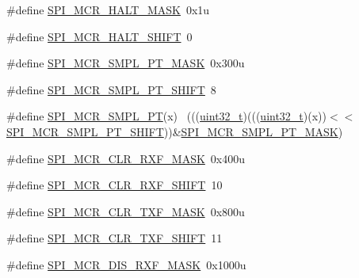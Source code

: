 \begin{DoxyCompactItemize}
\item 
\#define \hyperlink{group___s_p_i___register___masks_ga88c670302548b2d5b5f032b5709bc366}{S\+P\+I\+\_\+\+M\+C\+R\+\_\+\+H\+A\+L\+T\+\_\+\+M\+A\+SK}~0x1u
\item 
\#define \hyperlink{group___s_p_i___register___masks_ga8f13f49cf8502462271d8a179338d81b}{S\+P\+I\+\_\+\+M\+C\+R\+\_\+\+H\+A\+L\+T\+\_\+\+S\+H\+I\+FT}~0
\item 
\#define \hyperlink{group___s_p_i___register___masks_gaebb0539e04af465a39892f5aaabc872d}{S\+P\+I\+\_\+\+M\+C\+R\+\_\+\+S\+M\+P\+L\+\_\+\+P\+T\+\_\+\+M\+A\+SK}~0x300u
\item 
\#define \hyperlink{group___s_p_i___register___masks_ga1ffc13b9075cc6b0b34ea3162d6c1b74}{S\+P\+I\+\_\+\+M\+C\+R\+\_\+\+S\+M\+P\+L\+\_\+\+P\+T\+\_\+\+S\+H\+I\+FT}~8
\item 
\#define \hyperlink{group___s_p_i___register___masks_ga5c2964171c6cf43a92d15e15373ed2ae}{S\+P\+I\+\_\+\+M\+C\+R\+\_\+\+S\+M\+P\+L\+\_\+\+PT}(x)                                          ~(((\hyperlink{_p_e___types_8h_a33594304e786b158f3fb30289278f5af}{uint32\+\_\+t})(((\hyperlink{_p_e___types_8h_a33594304e786b158f3fb30289278f5af}{uint32\+\_\+t})(x))$<$$<$\hyperlink{group___s_p_i___register___masks_ga1ffc13b9075cc6b0b34ea3162d6c1b74}{S\+P\+I\+\_\+\+M\+C\+R\+\_\+\+S\+M\+P\+L\+\_\+\+P\+T\+\_\+\+S\+H\+I\+FT}))\&\hyperlink{group___s_p_i___register___masks_gaebb0539e04af465a39892f5aaabc872d}{S\+P\+I\+\_\+\+M\+C\+R\+\_\+\+S\+M\+P\+L\+\_\+\+P\+T\+\_\+\+M\+A\+SK})
\item 
\#define \hyperlink{group___s_p_i___register___masks_gaedd370380f06f2e4bf2ca01babda8732}{S\+P\+I\+\_\+\+M\+C\+R\+\_\+\+C\+L\+R\+\_\+\+R\+X\+F\+\_\+\+M\+A\+SK}~0x400u
\item 
\#define \hyperlink{group___s_p_i___register___masks_gae1f4b01eb27f199a893e42f6a3d3edb7}{S\+P\+I\+\_\+\+M\+C\+R\+\_\+\+C\+L\+R\+\_\+\+R\+X\+F\+\_\+\+S\+H\+I\+FT}~10
\item 
\#define \hyperlink{group___s_p_i___register___masks_ga5b57559246a1a4c32c53542e9f0ea2cb}{S\+P\+I\+\_\+\+M\+C\+R\+\_\+\+C\+L\+R\+\_\+\+T\+X\+F\+\_\+\+M\+A\+SK}~0x800u
\item 
\#define \hyperlink{group___s_p_i___register___masks_ga0f0a133d00c115835f0b50c334c104cf}{S\+P\+I\+\_\+\+M\+C\+R\+\_\+\+C\+L\+R\+\_\+\+T\+X\+F\+\_\+\+S\+H\+I\+FT}~11
\item 
\#define \hyperlink{group___s_p_i___register___masks_ga27dfc23fb0551340c07676e7092267d4}{S\+P\+I\+\_\+\+M\+C\+R\+\_\+\+D\+I\+S\+\_\+\+R\+X\+F\+\_\+\+M\+A\+SK}~0x1000u
\item 
$$
\end{DoxyCompactItemize}
